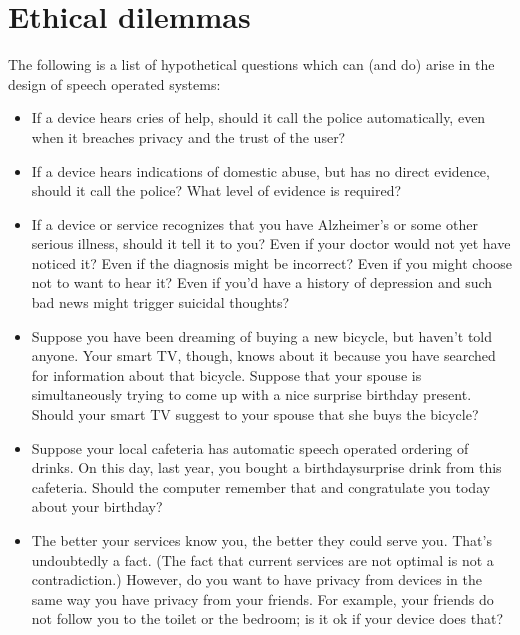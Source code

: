 \documentclass[letterpaper,10pt,english]{jupyterBook}
\begin{document}
\section{Ethical dilemmas}
\label{\detokenize{Security_and_privacy:ethical-dilemmas}}
\sphinxAtStartPar
The following is a list of hypothetical questions which can (and do)
arise in the design of speech operated systems:
\begin{itemize}
\item {} 
\sphinxAtStartPar
If a device hears cries of help, should it call the police
automatically, even when it breaches privacy and the trust of the
user?

\item {} 
\sphinxAtStartPar
If a device hears indications of domestic abuse, but has no direct
evidence, should it call the police? What level of evidence is
required?

\item {} 
\sphinxAtStartPar
If a device or service recognizes that you have Alzheimer’s or some
other serious illness, should it tell it to you? Even if your doctor
would not yet have noticed it? Even if the diagnosis might be
incorrect? Even if you might choose not to want to hear it? Even if
you’d have a history of depression and such bad news might trigger
suicidal thoughts?

\item {} 
\sphinxAtStartPar
Suppose you have been dreaming of buying a new bicycle, but haven’t
told anyone. Your smart TV, though, knows about it because you have
searched for information about that bicycle. Suppose that your
spouse is simultaneously trying to come up with a nice surprise
birthday present. Should your smart TV suggest to your spouse that
she buys the bicycle?

\item {} 
\sphinxAtStartPar
Suppose your local cafeteria has automatic speech operated ordering
of drinks. On this day, last year, you bought a birthday\sphinxhyphen{}surprise
drink from this cafeteria. Should the computer remember that and
congratulate you today about your birthday?

\item {} 
\sphinxAtStartPar
The better your services know you, the better they could serve you.
That’s undoubtedly a fact. (The fact that current services are not
optimal is not a contradiction.) However, do you want to have
privacy from devices in the same way you have privacy from your
friends. For example, your friends do not follow you to the toilet
or the bedroom; is it ok if your device does that?

\end{itemize}
\end{document}
